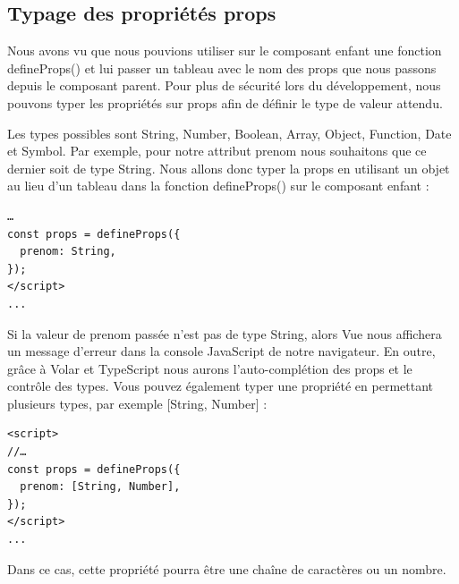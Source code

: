 \documentclass{article}
\begin{document}
\subsection{Typage des propriétés props}
Nous avons vu que nous pouvions utiliser sur le composant enfant une fonction {\color{monOrange}defineProps()} et lui passer un tableau avec le nom des {\color{monOrange}props} que nous passons depuis le composant parent. Pour plus de sécurité lors du développement, nous pouvons typer les propriétés sur {\color{monOrange}props} afin de définir le type de valeur attendu.

Les types possibles sont {\color{monOrange}String, Number, Boolean, Array, Object, Function, Date} et {\color{monOrange}Symbol}. Par exemple, pour notre attribut {\color{monOrange}prenom} nous souhaitons que ce dernier soit de type {\color{monOrange}String}. Nous allons donc typer la {\color{monOrange}props} en utilisant un objet au lieu d'un tableau dans la fonction {\color{monOrange}defineProps()} sur le composant enfant :
\begin{verbatim}
…
const props = defineProps({
  prenom: String,
});
</script>
...
\end{verbatim}
Si la valeur de {\color{monOrange}prenom} passée n'est pas de type {\color{monOrange}String}, alors {\color{monOrange}Vue} nous affichera un message d'erreur dans la console JavaScript de notre navigateur. En outre, grâce à {\color{monOrange}Volar} et {\color{monOrange}TypeScript} nous aurons l'auto-complétion des {\color{monOrange}props} et le contrôle des types. Vous pouvez également typer une propriété en permettant plusieurs types, par exemple {\color{monOrange}[String, Number]} :
\begin{verbatim}
<script>
//…
const props = defineProps({
  prenom: [String, Number],
});
</script>
...
\end{verbatim}
Dans ce cas, cette propriété pourra être une chaîne de caractères ou un nombre.
\end{document}
